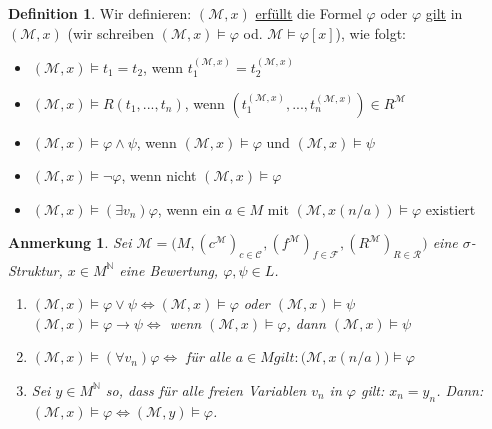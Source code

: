 \documentclass{article}
\theoremstyle{definition}
\newtheorem{dfn}{Definition}[section]
\theoremstyle{plain}
\newtheorem*{anm}{Anmerkung}
\newcommand{\m}[1]{\mathcal{#1}}
\newcommand{\struc}[3]{\big(#1, (c^{#2})_{c \in \m{C}_{#3}}, (f^{#2})_{f \in \m{F}_{#3}}, (R^{#2})_{R \in \m{R}_{#3}}\big)}
\begin{document}
    \begin{dfn}
        Wir definieren: $ (\m{M}, x) $ \underline{erfüllt} die Formel $ \varphi $ oder $ \varphi $ \underline{gilt} in $ (\m{M}, x) $ (wir schreiben $ (\m{M}, x) \models \varphi $ od. $ \m{M} \models \varphi[x] $), wie folgt:
        \begin{itemize}
            \item $ (\m{M}, x) \models t_1 = t_2 $, wenn $ t^{(\m{M}, x)}_1 = t^{(\m{M}, x)}_2 $
            \item $ (\m{M}, x) \models R(t_1, ..., t_n) $, wenn $ (t_1^{(\m{M}, x)}, ..., t_n^{(\m{M}, x)}) \in R^\m{M} $
            \item $ (\m{M}, x) \models \varphi \land \psi $, wenn $ (\m{M}, x) \models \varphi $ und $ (\m{M}, x) \models \psi $
            \item $ (\m{M}, x) \models \neg \varphi $, wenn nicht $ (\m{M}, x) \models \varphi $
            \item $ (\m{M}, x) \models (\exists v_n) \varphi $, wenn ein $ a \in M $ mit $ (\m{M}, x(n/a)) \models \varphi $ existiert
        \end{itemize}
    \end{dfn}

    \begin{anm}
        Sei $ \m{M} = \struc{M}{\m{M}}{} $ eine $ \sigma $-Struktur, $ x \in M^{\mathbb{N}} $ eine Bewertung, $\varphi, \psi \in L $.
        \begin{enumerate}
            \item $ (\m{M}, x) \models \varphi \lor \psi \Leftrightarrow (\m{M}, x) \models \varphi $ oder $ (\m{M}, x) \models \psi $\\
            $ (\m{M}, x) \models \varphi \rightarrow \psi \Leftrightarrow $ wenn $ (\m{M}, x) \models \varphi $, dann $ ( \m{M}, x) \models \psi $
            \item $ (\m{M}, x) \models (\forall v_n) \varphi \Leftrightarrow $ für alle $ a \in M gilt: \big(\m{M}, x(n/a)\big) \models \varphi $
            \item Sei $ y \in M^{\mathbb{N}} $ so, dass für alle freien Variablen $ v_n $ in $ \varphi $ gilt: $ x_n = y_n $.
            Dann: $ (\m{M}, x) \models \varphi \Leftrightarrow (\m{M}, y ) \models \varphi $. \label{itm:freie-variablen-gleich}
        \end{enumerate}
    \end{anm}
\end{document}
